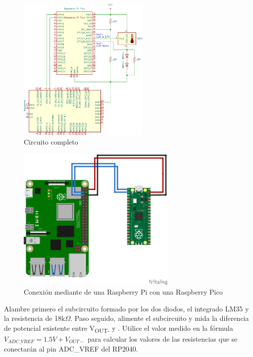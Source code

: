\noindent
\begin{minipage}{0.5\linewidth}
\begin{figure}[H]
	\centering
	\includegraphics[width=\linewidth,height=7cm,keepaspectratio]{img/lm35-pico-pi.png}
	\caption{Circuito completo}
	\label{fig:circuit-full} %
\end{figure}
\end{minipage}%
\begin{minipage}{0.5\linewidth}
\begin{figure}[H]
	\centering
	\includegraphics[width=\linewidth,height=7cm,keepaspectratio]{img/pi-pico-i2c.png}
	\caption[Conexión de una Raspberry Pi con una Raspberry Pico via \IIC]{\centering Conexión mediante \IIC de una Raspberry Pi con una Raspberry Pico\footnotemark}%
	\label{fig:pi-pico-i2c} %
\end{figure}
\end{minipage}%

\bigskip{}

Alambre primero el subcircuito formado por los dos diodos, el integrado LM35 y la resistencia de 18k$\Omega$.
Paso seguido, alimente el subcircuito y mida la diferencia de potencial existente entre V\textsubscript{OUT-} y \GND{}.
Utilice el valor medido en la fórmula $V_{ADC\_VREF} = 1.5V + V_{OUT-}$ para calcular los valores de las resistencias que se conectarán al pin ADC\_VREF del RP2040.

